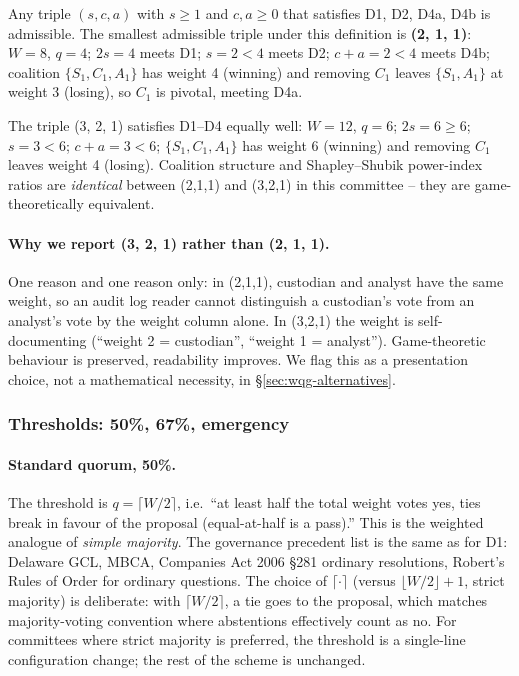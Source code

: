 \documentclass[10pt,twocolumn]{article}
\begin{document}
Any triple $(s,c,a)$ with $s \geq 1$ and $c,a \geq 0$ that satisfies
D1, D2, D4a, D4b is admissible. The smallest admissible triple
under this definition is \textbf{(2, 1, 1)}: $W=8$, $q=4$; $2s=4$
meets D1; $s=2 < 4$ meets D2; $c+a=2 < 4$ meets D4b; coalition
$\{S_1, C_1, A_1\}$ has weight 4 (winning) and removing $C_1$
leaves $\{S_1, A_1\}$ at weight 3 (losing), so $C_1$ is pivotal,
meeting D4a.

The triple (3, 2, 1) satisfies D1--D4 equally well: $W=12$, $q=6$;
$2s=6 \geq 6$; $s=3 < 6$; $c+a=3 < 6$; $\{S_1,C_1,A_1\}$ has weight
6 (winning) and removing $C_1$ leaves weight 4 (losing). Coalition
structure and Shapley--Shubik power-index ratios are \emph{identical}
between (2,1,1) and (3,2,1) in this committee -- they are
game-theoretically equivalent.

\paragraph{Why we report (3, 2, 1) rather than (2, 1, 1).}
One reason and one reason only: in (2,1,1), custodian and analyst
have the same weight, so an audit log reader cannot distinguish a
custodian's vote from an analyst's vote by the weight column alone.
In (3,2,1) the weight is self-documenting (``weight 2 = custodian'',
``weight 1 = analyst''). Game-theoretic behaviour is preserved,
readability improves. We flag this as a presentation choice,
not a mathematical necessity, in \S\ref{sec:wqg-alternatives}.

\subsubsection{Thresholds: 50\%, 67\%, emergency}
\label{sec:wqg-thresholds}

\paragraph{Standard quorum, 50\%.}
The threshold is $q = \lceil W/2 \rceil$, i.e.\ ``at least half
the total weight votes yes, ties break in favour of the proposal
(equal-at-half is a pass).'' This is the weighted analogue of
\emph{simple majority}. The governance precedent list is the same
as for D1: Delaware GCL, MBCA, Companies Act 2006 \S281 ordinary
resolutions, Robert's Rules of Order for ordinary questions. The
choice of $\lceil \cdot \rceil$ (versus $\lfloor W/2 \rfloor + 1$,
strict majority) is deliberate: with $\lceil W/2 \rceil$, a tie
goes to the proposal, which matches majority-voting convention
where abstentions effectively count as no. For committees where
strict majority is preferred, the threshold is a single-line
configuration change; the rest of the scheme is unchanged.
\end{document}
